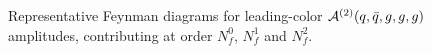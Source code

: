 \begin{figure}[ht]
  \begin{center}
\end{center} 
\caption{Representative Feynman diagrams for leading-color
$\mathcal{A}^{(2)}(q,\bar q,g,g,g)$ amplitudes, 
contributing at order
 $N_f^0$, $N_f^1$ and $N_f^2$.}
\label{fig_parents2q3g}
\end{figure}

